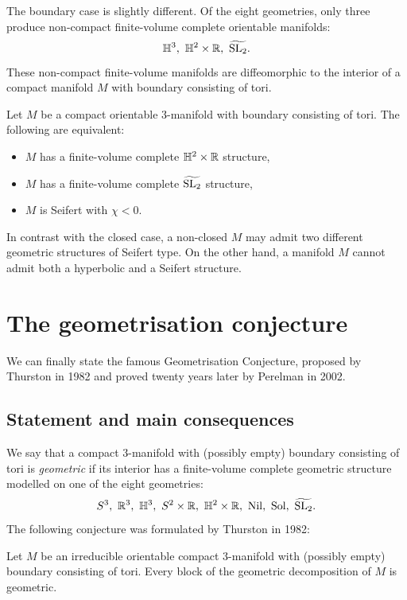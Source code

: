 The boundary case is slightly different. Of the eight geometries, only three produce non-compact finite-volume complete orientable manifolds:
$$\matH^3,\ \matH^2 \times \matR,\ \widetilde{\SL_2}.$$
These non-compact finite-volume manifolds are diffeomorphic to the interior of a compact manifold $M$ with boundary consisting of tori.

\begin{teo}
Let $M$ be a compact orientable 3-manifold with boundary consisting of tori. The following are equivalent:
\begin{itemize}
\item $M$ has a finite-volume complete $\mathbb{H}^2 \times \mathbb{R}$ structure,
\item $M$ has a finite-volume complete $\widetilde{{\rm SL}_2}$ structure,
\item $M$ is Seifert with $\chi<0$.
\end{itemize}
\end{teo}

In contrast with the closed case, a non-closed $M$ may admit two different geometric structures of Seifert type. On the other hand, a manifold $M$ cannot admit both a hyperbolic and a Seifert structure. 

\section{The geometrisation conjecture} \label{geometrisation:section}

We can finally state the famous Geometrisation Conjecture, proposed by Thurston in 1982 and proved twenty years later by Perelman in 2002.

\subsection{Statement and main consequences}
We say that a compact 3-manifold with (possibly empty) boundary consisting of tori is \emph{geometric} if its interior has a finite-volume complete geometric structure modelled on one of the eight geometries: 
$$S^3,\ \matR^3,\ \matH^3,\ S^2\times \matR,\ \matH^2\times \matR,\ \Nil,\ \Sol,\ \widetilde{\SL_2}.$$
The following conjecture was formulated by Thurston in 1982:

\begin{conj}
Let $M$ be an irreducible orientable compact 3-manifold with (possibly empty) boundary consisting of tori. Every block of the geometric decomposition of $M$ is geometric.
\end{conj}

